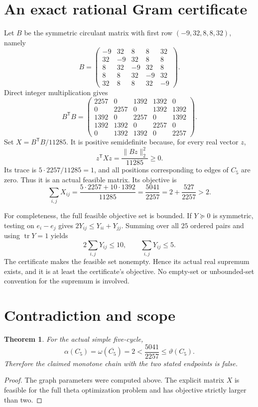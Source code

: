 \documentclass[11pt]{article}
\newtheorem{theorem}{Theorem}
\begin{document}
\newpage
\section*{An exact rational Gram certificate}
Let $B$ be the symmetric circulant matrix with first row
$(-9,32,8,8,32)$, namely
\[
B=\begin{pmatrix}
-9&32&8&8&32\\
32&-9&32&8&8\\
8&32&-9&32&8\\
8&8&32&-9&32\\
32&8&8&32&-9
\end{pmatrix}.
\]
Direct integer multiplication gives
\[
B^{\mathsf T}B=\begin{pmatrix}
2257&0&1392&1392&0\\
0&2257&0&1392&1392\\
1392&0&2257&0&1392\\
1392&1392&0&2257&0\\
0&1392&1392&0&2257
\end{pmatrix}.
\]
Set $X=B^{\mathsf T}B/11285$. It is positive semidefinite
because, for every real vector $z$,
\[
 z^{\mathsf T}Xz=\frac{\lVert Bz\rVert_2^2}{11285}\geq0.
\]
Its trace is $5\cdot2257/11285=1$, and all positions
corresponding to edges of $C_5$ are zero. Thus it is an
actual feasible matrix. Its objective is
\[
 \sum_{i,j}X_{ij}
 =\frac{5\cdot2257+10\cdot1392}{11285}
 =\frac{5041}{2257}
 =2+\frac{527}{2257}>2.
\]

For completeness, the full feasible objective set is bounded.
If $Y\succeq0$ is symmetric, testing on $e_i-e_j$ gives
$2Y_{ij}\leq Y_{ii}+Y_{jj}$. Summing over all $25$ ordered
pairs and using $\operatorname{tr}Y=1$ yields
\[
             2\sum_{i,j}Y_{ij}\leq10,
             \qquad\sum_{i,j}Y_{ij}\leq5.
\]
The certificate makes the feasible set nonempty. Hence
its actual real supremum exists, and it is at least the
certificate's objective. No empty-set or unbounded-set
convention for the supremum is involved.

\newpage
\section*{Contradiction and scope}
\begin{theorem}
For the actual simple five-cycle,
\[
 \alpha(C_5)=\omega(\overline{C_5})=2
       <\frac{5041}{2257}\leq\vartheta(C_5).
\]
Therefore the claimed monotone chain with the two stated
endpoints is false.
\end{theorem}
\begin{proof}
The graph parameters were computed above. The explicit
matrix $X$ is feasible for the full theta optimization
problem and has objective strictly larger than two.
\end{proof}
\end{document}
